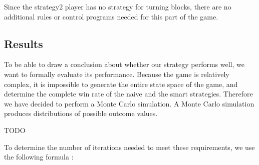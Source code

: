 Since the strategy2 player has no strategy for turning blocks, there are no additional rules or control programs needed for this part of the game.

\subsection{Results}
To be able to draw a conclusion about whether our strategy performs well, we want to formally evaluate its performance.
Because the game is relatively complex, it is impossible to generate the entire state space of the game, and determine the complete win rate of the naive and the smart strategies.
Therefore we have decided to perform a Monte Carlo simulation. A Monte Carlo simulation produces distributions of possible outcome values.

\vspace{6pt}

TODO

To determine the number of iterations needed to meet these requirements, we use the following formula \cite{sim-modeling}:

